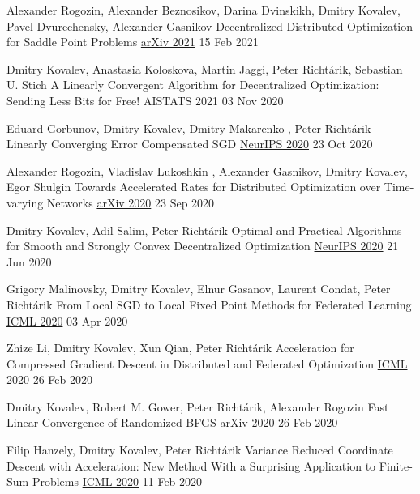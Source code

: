 \begin{cventries}
\cventry
{Alexander Rogozin, Alexander Beznosikov, Darina Dvinskikh, Dmitry Kovalev, Pavel Dvurechensky, Alexander Gasnikov} %
{Decentralized Distributed Optimization for Saddle Point Problems} %
{\href{https://arxiv.org/abs/2102.07758}{arXiv 2021}} 
{15 Feb 2021} %
{}	

\cventry
{Dmitry Kovalev, Anastasia Koloskova, Martin Jaggi, Peter Richtárik, Sebastian U. Stich} %
{A Linearly Convergent Algorithm for Decentralized Optimization: Sending Less Bits for Free!} %
{AISTATS 2021} 
{03 Nov 2020} %
{}	

\cventry
{Eduard Gorbunov, Dmitry Kovalev, Dmitry Makarenko , Peter Richtárik} %
{Linearly Converging Error Compensated SGD} %
{\href{https://papers.nips.cc/paper/2020/hash/ef9280fbc5317f17d480e4d4f61b3751-Abstract.html}{NeurIPS 2020}} 
{23 Oct 2020} %
{}	

\cventry
{Alexander Rogozin, Vladislav Lukoshkin , Alexander Gasnikov, Dmitry Kovalev, Egor Shulgin} %
{Towards Accelerated Rates for Distributed Optimization over Time-varying Networks} %
{\href{https://arxiv.org/abs/2009.11069}{arXiv 2020}} 
{23 Sep 2020} %
{}	

\cventry
{Dmitry Kovalev, Adil Salim, Peter Richtárik} %
{Optimal and Practical Algorithms for Smooth and Strongly Convex Decentralized Optimization} %
{\href{https://papers.nips.cc/paper/2020/hash/d530d454337fb09964237fecb4bea6ce-Abstract.html}{NeurIPS 2020}} 
{21 Jun 2020} %
{}	

\cventry
{Grigory Malinovsky, Dmitry Kovalev, Elnur Gasanov, Laurent Condat, Peter Richtárik} %
{From Local SGD to Local Fixed Point Methods for Federated Learning} %
{\href{http://proceedings.mlr.press/v119/malinovskiy20a.html}{ICML 2020}} 
{03 Apr 2020} %
{}	

\cventry
{Zhize Li, Dmitry Kovalev, Xun Qian, Peter Richtárik} %
{Acceleration for Compressed Gradient Descent in Distributed and Federated Optimization} %
{\href{http://proceedings.mlr.press/v119/li20g.html}{ICML 2020}} 
{26 Feb 2020} %
{}	

\cventry
{Dmitry Kovalev, Robert M. Gower, Peter Richtárik, Alexander Rogozin} %
{Fast Linear Convergence of Randomized BFGS} %
{\href{https://arxiv.org/abs/2002.11337}{arXiv 2020}} 
{26 Feb 2020} %
{}	

\cventry
{Filip Hanzely, Dmitry Kovalev, Peter Richtárik} %
{Variance Reduced Coordinate Descent with Acceleration: New Method With a Surprising Application to Finite-Sum Problems} %
{\href{http://proceedings.mlr.press/v119/hanzely20b.html}{ICML 2020}} 
{11 Feb 2020} %
{}	


\end{cventries}
